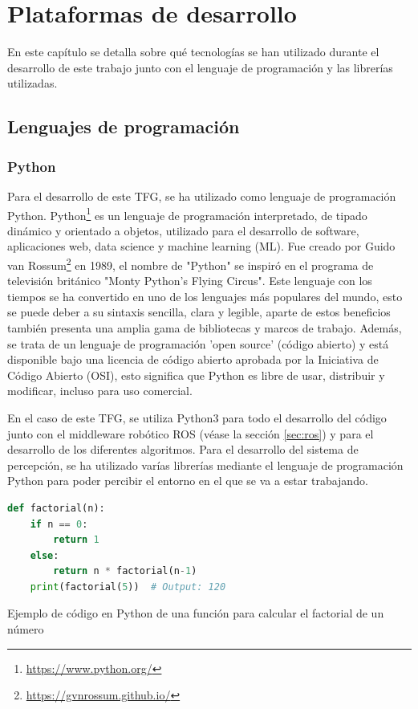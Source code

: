 \chapter{Plataformas de desarrollo}
\label{cap:capitulo3}

En este capítulo se detalla sobre qué tecnologías se han utilizado durante el desarrollo de este trabajo junto con el lenguaje de programación y las librerías utilizadas.
\section{Lenguajes de programación}
\label{sec:programación}
\subsection{Python}
\label{sec:python}
Para el desarrollo de este TFG, se ha utilizado como lenguaje de programación Python. Python\footnote{\url{https://www.python.org/}} es un lenguaje de programación interpretado, 
de tipado dinámico y orientado a objetos,
utilizado para el desarrollo de software, aplicaciones web, data science y machine learning (ML).  
Fue creado por Guido van Rossum\footnote{\url{https://gvnrossum.github.io/}} en 1989, el nombre de "Python" se inspiró en el programa de televisión británico 
"Monty Python's Flying Circus".
Este lenguaje con los tiempos se ha convertido en uno de los lenguajes más populares del mundo, esto se puede deber a su sintaxis sencilla, clara y legible, aparte 
de estos beneficios también presenta una amplia gama de bibliotecas y marcos de trabajo. Además, se trata de un lenguaje de programación 'open source' (código abierto) y está disponible bajo
una licencia de código abierto aprobada por la Iniciativa de Código Abierto (OSI), esto significa que Python es libre de usar, distribuir y modificar, incluso para uso
comercial.

En el caso de este TFG, se utiliza Python3 para todo el desarrollo del código junto con el middleware robótico ROS (véase la sección \ref{sec:ros}) y para el desarrollo
de los diferentes algoritmos. Para el desarrollo del sistema de percepción, se ha  utilizado varías librerías mediante el lenguaje de programación Python para poder
percibir el entorno en el que se va a estar trabajando. 

\begin{code}[h]
\begin{lstlisting}[language=Python]
  def factorial(n):
    if n == 0:
        return 1
    else:
        return n * factorial(n-1)
    print(factorial(5))  # Output: 120

\end{lstlisting}
\caption[Ejemplo de código en Python de una función para calcular el factorial de un número]{Ejemplo de código en Python de una función para calcular el factorial de un número}
\label{cod:codejemplo}
\end{code}  

